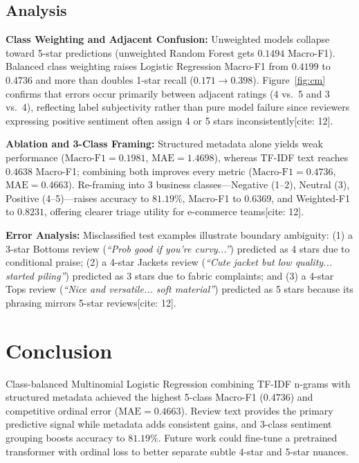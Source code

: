 \documentclass[10pt,twocolumn,a4paper]{IEEEtran}
\begin{document}
\subsection{Analysis}
\textbf{Class Weighting and Adjacent Confusion:} Unweighted models collapse toward 5-star predictions (unweighted Random Forest gets $0.1494$ Macro-F1). Balanced class weighting raises Logistic Regression Macro-F1 from $0.4199$ to $0.4736$ and more than doubles 1-star recall ($0.171 \rightarrow 0.398$). Figure~\ref{fig:cm} confirms that errors occur primarily between adjacent ratings (4 vs.\ 5 and 3 vs.\ 4), reflecting label subjectivity rather than pure model failure since reviewers expressing positive sentiment often assign 4 or 5 stars inconsistently[cite: 12].

\textbf{Ablation and 3-Class Framing:} Structured metadata alone yields weak performance ($\text{Macro-F1}=0.1981$, $\text{MAE}=1.4698$), whereas TF-IDF text reaches $0.4638$ Macro-F1; combining both improves every metric ($\text{Macro-F1}=0.4736$, $\text{MAE}=0.4663$). Re-framing into 3 business classes---Negative (1--2), Neutral (3), Positive (4--5)---raises accuracy to $81.19\%$, Macro-F1 to $0.6369$, and Weighted-F1 to $0.8231$, offering clearer triage utility for e-commerce teams[cite: 12].

\textbf{Error Analysis:} Misclassified test examples illustrate boundary ambiguity: (1) a 3-star Bottoms review (\textit{``Prob good if you're curvy...''}) predicted as 4 stars due to conditional praise; (2) a 4-star Jackets review (\textit{``Cute jacket but low quality... started piling''}) predicted as 3 stars due to fabric complaints; and (3) a 4-star Tops review (\textit{``Nice and versatile... soft material''}) predicted as 5 stars because its phrasing mirrors 5-star reviews[cite: 12].

\section{Conclusion}
Class-balanced Multinomial Logistic Regression combining TF-IDF n-grams with structured metadata achieved the highest 5-class Macro-F1 ($0.4736$) and competitive ordinal error ($\text{MAE}=0.4663$). Review text provides the primary predictive signal while metadata adds consistent gains, and 3-class sentiment grouping boosts accuracy to $81.19\%$. Future work could fine-tune a pretrained transformer with ordinal loss to better separate subtle 4-star and 5-star nuances.

\newpage
\end{document}
